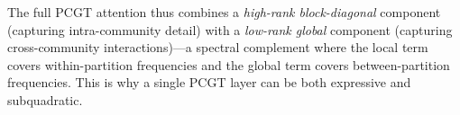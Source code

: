 The full PCGT attention thus combines a \emph{high-rank block-diagonal} component (capturing intra-community detail) with a \emph{low-rank global} component (capturing cross-community interactions)---a spectral complement where the local term covers within-partition frequencies and the global term covers between-partition frequencies. This is why a single PCGT layer can be both expressive and subquadratic.


